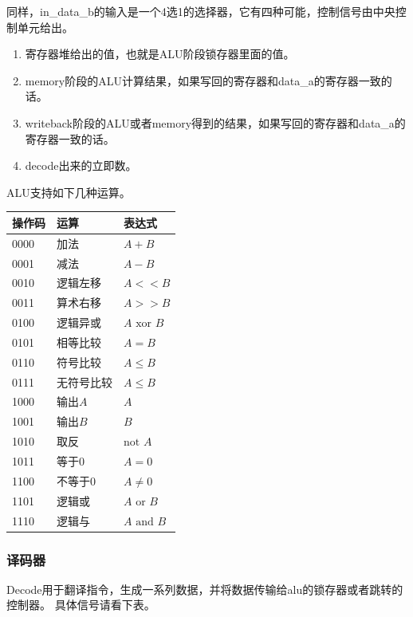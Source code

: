     同样，in\_data\_b的输入是一个4选1的选择器，它有四种可能，控制信号由中央控制单元给出。
    \begin{enumerate}
        \item 寄存器堆给出的值，也就是ALU阶段锁存器里面的值。
        \item memory阶段的ALU计算结果，如果写回的寄存器和data\_a的寄存器一致的话。
        \item writeback阶段的ALU或者memory得到的结果，如果写回的寄存器和data\_a的寄存器一致的话。
        \item decode出来的立即数。
    \end{enumerate}

    ALU支持如下几种运算。
    \begin{center}
        \begin{longtable}{lll}
            \toprule
            操作码 & 运算 & 表达式 \\
            \midrule
            0000 & 加法 & $A+B$ \\
            0001 & 减法 & $A-B$ \\
            0010 & 逻辑左移 & $A<<B$ \\
            0011 & 算术右移 & $A>>B$ \\
            0100 & 逻辑异或 & $A \text{ xor } B$ \\
            0101 & 相等比较 & $A=B$ \\
            0110 & 符号比较 & $A \le B$ \\
            0111 & 无符号比较 & $A \le B$ \\
            1000 & 输出$A$ & $A$ \\
            1001 & 输出$B$ & $B$ \\
            1010 & 取反 & $\text{not } A$ \\
            1011 & 等于0 & $A=0$ \\
            1100 & 不等于0 & $A \not= 0$ \\
            1101 & 逻辑或 & $A \text{ or } B$ \\
            1110 & 逻辑与 & $A \text{ and } B$ \\
            \bottomrule
        \end{longtable}
    \end{center}

\subsubsection{译码器}
Decode用于翻译指令，生成一系列数据，并将数据传输给alu的锁存器或者跳转的控制器。
具体信号请看下表。

